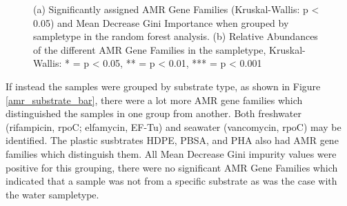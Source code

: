 \begin{figure}[h]
    \centering
    \caption{(a) Significantly assigned AMR Gene Families (Kruskal-Wallis: p < 0.05) and Mean Decrease Gini Importance when grouped by sampletype in the random forest analysis. (b) Relative Abundances of the different AMR Gene Families in the sampletype, Kruskal-Wallis: * = p < 0.05, ** = p < 0.01, *** = p < 0.001}
    \label{amr_sampletype}
\end{figure}

If instead the samples were grouped by substrate type, as shown in Figure \ref{amr_substrate_bar}, there were a lot more AMR gene families which distinguished the samples in one group from another.
Both freshwater (rifampicin, rpoC; elfamycin, EF-Tu) and seawater (vancomycin, rpoC) may be identified. The plastic susbtrates HDPE, PBSA, and PHA also had AMR gene families which distinguish them.
All Mean Decrease Gini impurity values were positive for this grouping, there were no significant AMR Gene Families which indicated that a sample was not from a specific substrate as was the case with the water sampletype. 

